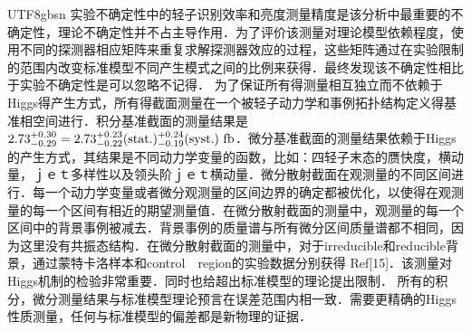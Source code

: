 \begin{CJK}{UTF8}{gbsn}
实验不确定性中的轻子识别效率和亮度测量精度是该分析中最重要的不确定性，理论不确定性并不占主导作用．为了评价该测量对理论模型依赖程度，使用不同的探测器相应矩阵来重复求解探测器效应的过程，这些矩阵通过在实验限制的范围内改变标准模型不同产生模式之间的比例来获得．最终发现该不确定性相比于实验不确定性是可以忽略不记得．
	为了保证所有得测量相互独立而不依赖于Higgs得产生方式，所有得截面测量在一个被轻子动力学和事例拓扑结构定义得基准相空间进行．积分基准截面的测量结果是$2.73^{+0.30}_{-0.29}=2.73^{+0.23}_{-0.22}({\rm stat.})^{+0.24}_{-0.19}({\rm syst.})~{\rm fb}$．微分基准截面的测量结果依赖于Higgs的产生方式，其结果是不同动力学变量的函数，比如：四轻子末态的赝快度，横动量，ｊｅｔ多样性以及领头阶ｊｅｔ横动量．微分散射截面在观测量的不同区间进行．每一个动力学变量或者微分观测量的区间边界的确定都被优化，以使得在观测量的每一个区间有相近的期望测量值．在微分散射截面的测量中，观测量的每一个区间中的背景事例被减去．背景事例的质量谱与所有微分区间质量谱都不相同，因为这里没有共振态结构．在微分散射截面的测量中，对于irreducible和reducible背景，通过蒙特卡洛样本和control　region的实验数据分别获得 Ref[15]．该测量对Higgs机制的检验非常重要．同时也给超出标准模型的理论提出限制．
所有的积分，微分测量结果与标准模型理论预言在误差范围内相一致．需要更精确的Higgs性质测量，任何与标准模型的偏差都是新物理的证据．


\end{CJK}
